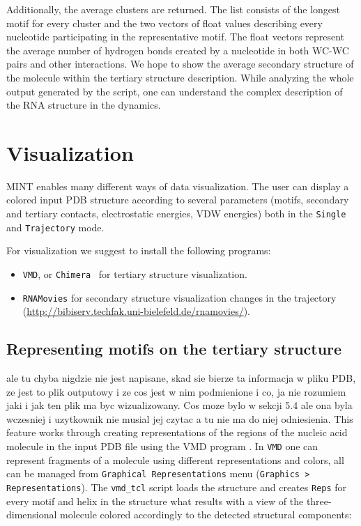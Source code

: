 \documentclass[12pt]{article}
\begin{document}
Additionally, the average clusters are returned. The list consists of the longest motif for every cluster and the two vectors of float values describing every nucleotide participating in the representative motif. The float vectors represent the average number of hydrogen bonds created by a nucleotide in both WC-WC pairs and other interactions. We hope to show the average secondary structure of the molecule within the tertiary structure description. While analyzing the whole output generated by the script, one can understand the complex description of the RNA structure in the dynamics.


\section{Visualization}\label{Visualization}
MINT enables many different ways of data visualization. The user can display a colored input PDB structure according to several parameters (motifs, secondary and tertiary contacts, electrostatic energies, VDW energies) both in the \texttt{Single} and \texttt{Trajectory} mode. 

For visualization we suggest to install the following programs:
\begin{itemize}
\item {\tt VMD}\cite{Humphrey1996}, or {\tt Chimera}~\cite{Pettersen2004} for tertiary structure visualization.
\item {\tt RNAMovies} for secondary structure visualization changes in the trajectory (\url{http://bibiserv.techfak.uni-bielefeld.de/rnamovies/}).
\end{itemize}

\subsection{Representing motifs on the tertiary structure} 
\label{VMD}
{\color{red} ale tu chyba nigdzie nie jest napisane, skad sie bierze ta informacja w pliku PDB, ze jest to plik outputowy i ze cos jest w nim podmienione i co, ja nie rozumiem jaki i jak ten plik ma byc wizualizowany. Cos moze bylo w sekcji 5.4 ale ona byla wczesniej i uzytkownik nie musial jej czytac a tu nie ma do niej odniesienia.} 
This feature works through creating representations of the regions of the nucleic acid molecule in the input PDB file using the VMD program \cite{Humphrey1996}. In \texttt{VMD} one can represent fragments of a molecule using different representations and colors, all can be managed from \texttt{Graphical Representations} menu (\texttt{Graphics > Representations}). The \texttt{vmd\_tcl} script loads the structure and creates \texttt{Reps} for every motif and helix in the structure what results with a view of the three-dimensional molecule colored accordingly to the detected structural components:
\end{document}
